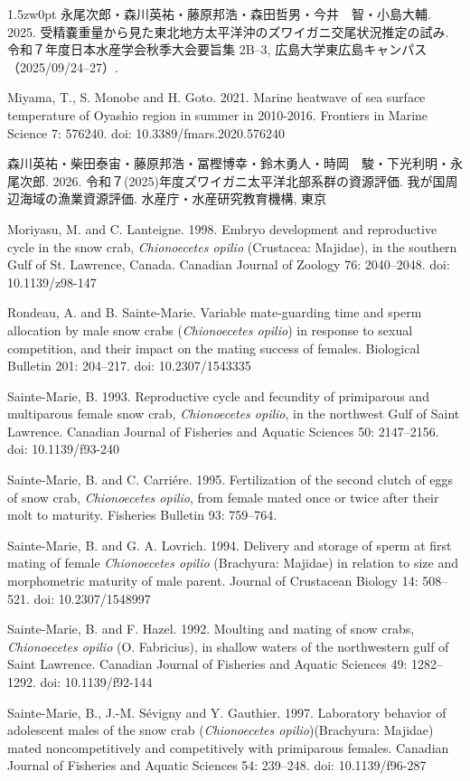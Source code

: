 \begin{indentation}{1.5zw}{0pt}
永尾次郎・森川英祐・藤原邦浩・森田哲男・今井　智・小島大輔. 2025. 受精嚢重量から見た東北地方太平洋沖のズワイガニ交尾状況推定の試み. 令和７年度日本水産学会秋季大会要旨集 2B--3, 広島大学東広島キャンパス（2025/09/24--27）.

Miyama, T., S. Monobe and H. Goto. 2021. Marine heatwave of sea surface temperature of Oyashio region in summer in 2010-2016. Frontiers in Marine Science 7: 576240. doi: 10.3389/fmars.2020.576240

森川英祐・柴田泰宙・藤原邦浩・冨樫博幸・鈴木勇人・時岡　駿・下光利明・永尾次郎. 2026. 令和７(2025)年度ズワイガニ太平洋北部系群の資源評価. 我が国周辺海域の漁業資源評価. 水産庁・水産研究教育機構, 東京

Moriyasu, M. and C. Lanteigne. 1998. Embryo development and reproductive cycle in the snow crab, \textit{Chionoecetes opilio} (Crustacea: Majidae), in the southern Gulf of St. Lawrence, Canada. Canadian Journal of Zoology 76: 2040--2048. doi: 10.1139/z98-147

Rondeau, A. and B. Sainte-Marie. Variable mate-guarding time and sperm allocation by male snow crabs (\textit{Chionoecetes opilio}) in response to sexual competition, and their impact on the mating success of females. Biological Bulletin 201: 204--217. doi: 10.2307/1543335

Sainte-Marie, B. 1993. Reproductive cycle and fecundity of primiparous and multiparous female snow crab, \textit{Chionoecetes opilio}, in the northwest Gulf of Saint Lawrence. Canadian Journal of Fisheries and Aquatic Sciences 50: 2147--2156. doi: 10.1139/f93-240

Sainte-Marie, B. and C. Carri\'{e}re. 1995. Fertilization of the second clutch of eggs of snow crab, \textit{Chionoecetes opilio}, from female mated once or twice after their molt to maturity. Fisheries Bulletin 93: 759--764. 

Sainte-Marie, B. and G. A. Lovrich. 1994. Delivery and storage of sperm at first mating of female \textit{Chionoecetes opilio} (Brachyura: Majidae) in relation to size and morphometric maturity of male parent. Journal of Crustacean Biology 14: 508--521. doi: 10.2307/1548997

Sainte-Marie, B. and F. Hazel. 1992. Moulting and mating of snow crabs, \textit{Chionoecetes opilio} (O. Fabricius), in shallow waters of the northwestern gulf of Saint Lawrence. Canadian Journal of Fisheries and Aquatic Sciences 49: 1282--1292. doi: 10.1139/f92-144

Sainte-Marie, B., J.-M. S\'{e}vigny and Y. Gauthier. 1997. Laboratory behavior of adolescent males of the snow crab (\textit{Chionoecetes opilio})(Brachyura: Majidae) mated noncompetitively and competitively with primiparous females. Canadian Journal of Fisheries and Aquatic Sciences 54: 239--248. doi: 10.1139/f96-287


\end{indentation}
